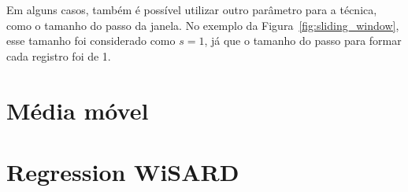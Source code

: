 Em alguns casos, também é possível utilizar outro parâmetro para a técnica, como o tamanho do passo da janela. No exemplo da Figura~\ref{fig:sliding_window}, esse tamanho foi considerado como $s=1$, já que o tamanho do passo para formar cada registro foi de 1.

\section{Média móvel}




\section{Regression WiSARD}


